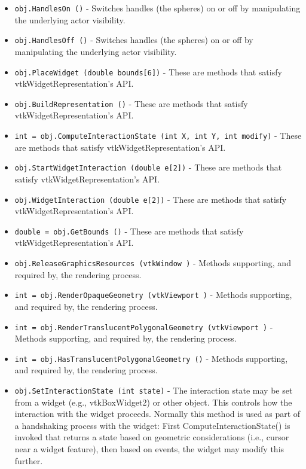 \begin{itemize}
\item  \verb|obj.HandlesOn ()| -  Switches handles (the spheres) on or off by manipulating the underlying
 actor visibility.

\item  \verb|obj.HandlesOff ()| -  Switches handles (the spheres) on or off by manipulating the underlying
 actor visibility.

\item  \verb|obj.PlaceWidget (double bounds[6])| -  These are methods that satisfy vtkWidgetRepresentation's API.

\item  \verb|obj.BuildRepresentation ()| -  These are methods that satisfy vtkWidgetRepresentation's API.

\item  \verb|int = obj.ComputeInteractionState (int X, int Y, int modify)| -  These are methods that satisfy vtkWidgetRepresentation's API.

\item  \verb|obj.StartWidgetInteraction (double e[2])| -  These are methods that satisfy vtkWidgetRepresentation's API.

\item  \verb|obj.WidgetInteraction (double e[2])| -  These are methods that satisfy vtkWidgetRepresentation's API.

\item  \verb|double = obj.GetBounds ()| -  These are methods that satisfy vtkWidgetRepresentation's API.

\item  \verb|obj.ReleaseGraphicsResources (vtkWindow )| -  Methods supporting, and required by, the rendering process.

\item  \verb|int = obj.RenderOpaqueGeometry (vtkViewport )| -  Methods supporting, and required by, the rendering process.

\item  \verb|int = obj.RenderTranslucentPolygonalGeometry (vtkViewport )| -  Methods supporting, and required by, the rendering process.

\item  \verb|int = obj.HasTranslucentPolygonalGeometry ()| -  Methods supporting, and required by, the rendering process.

\item  \verb|obj.SetInteractionState (int state)| -  The interaction state may be set from a widget (e.g., vtkBoxWidget2) or
 other object. This controls how the interaction with the widget
 proceeds. Normally this method is used as part of a handshaking
 process with the widget: First ComputeInteractionState() is invoked that
 returns a state based on geometric considerations (i.e., cursor near a
 widget feature), then based on events, the widget may modify this
 further.

\end{itemize}
